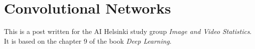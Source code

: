 \documentclass[]{article}
\begin{document}
\section{Convolutional Networks}
This is a post written for the AI Helsinki study group \emph{Image and Video Statistics}.
It is based on the chapter 9 of the book \emph{Deep Learning}.   
\end{document}

